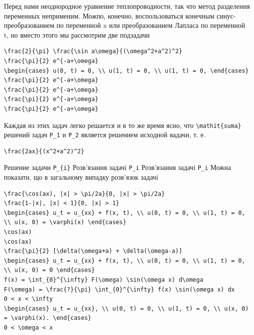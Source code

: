 \documentclass[
  ukrainian,
]{article}
\begin{document}
Перед нами неоднородное уравнение теплопроводности, так что метод
разделения переменных неприменим. Можпо, конечно, воспользоваться
конечным синус-преобразованием по переменной x или преобразованием
Лапласа по переменной t, но вместо этого мы рассмотрим две подзадачи

\begin{verbatim}
\frac{2}{\pi} \frac{\sin a\omega}{(\omega^2+a^2)^2}
\frac{\pi}{2} e^{-a+\omega}
\begin{cases} u(0, t) = 0, \\ u(1, t) = 0, \\ u(1, t) = 0, \end{cases}
\frac{\pi}{2} e^{-a+\omega}
\frac{\pi}{2} e^{-a+\omega}
\frac{\pi}{2} e^{-a+\omega}
\frac{\pi}{2} e^{-a+\omega}
\end{verbatim}

Каждая из этих задач легко решается и в то же время ясно, что
\texttt{\textbackslash{}mathit\{suma\}} решений задач \texttt{P\_1} и
\texttt{P\_2} является решением исходной вадачи, т. е.

\begin{verbatim}
\frac{2ax}{(x^2+a^2)^2}
\end{verbatim}

Решение задачи \texttt{P\_\{i\}} Розв'язання задачі \texttt{P\_i}
Розв'язання задачі \texttt{P\_i} Можна показати, що в загальному випадку
розв'язок задачі

\begin{verbatim}
\frac{\cos(ax), |x| > \pi/2a}{0, |x| > \pi/2a}
\frac{1-|x|, |x| < 1}{0, |x| > 1}
\begin{cases} u_t = u_{xx} + f(x, t), \\ u(0, t) = 0, \\ u(1, t) = 0, \\ u(x, 0) = \varphi(x) \end{cases}
\cos(ax)
\cos(ax)
\frac{\pi}{2} [\delta(\omega+a) + \delta(\omega-a)]
\begin{cases} u_t = u_{xx} + f(x, t), \\ u(0, t) = 0, \\ u(1, t) = 0, \\ u(x, 0) = 0 \end{cases}
f(x) = \int_{0}^{\infty} F(\omega) \sin(\omega x) d\omega
F(\omega) = \frac{?}{\pi} \int_{0}^{\infty} f(x) \sin(\omega x) dx
0 < x < \infty
\begin{cases} u_t = u_{xx}, \\ u(0, t) = 0, \\ u(1, t) = 0, \\ u(x, 0) = \varphi(x). \end{cases}
0 < \omega < x
\end{verbatim}
\end{document}
